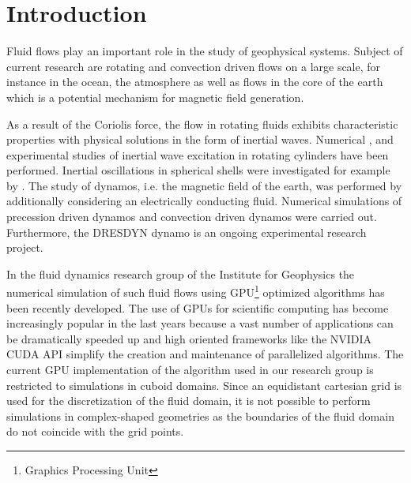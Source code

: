\chapter*{Introduction}

Fluid flows play an important role in the study of geophysical systems.
Subject of current research are rotating and convection driven flows on a large scale, for instance in the ocean, the atmosphere as
well as flows in the core of the earth which is a potential mechanism for magnetic field generation.

As a result of the Coriolis force, the flow in rotating fluids exhibits characteristic properties with
physical solutions in the form of inertial waves.
Numerical \citep{Sauret2012}, \citep{Duguet} and experimental
studies \citep{Fultz1959} of inertial wave excitation in rotating cylinders have been performed.
Inertial oscillations in spherical shells were investigated for example by \citep{Tilgner1999}.
The study of dynamos, i.e. the magnetic field of the earth, was performed by additionally
considering an electrically conducting fluid.
Numerical simulations of precession driven dynamos \citep{Tilgner2005}
and convection driven dynamos \citep{Tilgner2012} were carried out. Furthermore,
the DRESDYN dynamo \citep{Stefani2015} is an ongoing experimental research project.

In the fluid dynamics research group of the Institute for Geophysics
the numerical simulation of such fluid flows using GPU\footnote{Graphics Processing Unit} optimized algorithms has been recently developed.
The use of GPUs for scientific computing has become increasingly popular in the last years because
a vast number of applications  can  be dramatically speeded up and
high oriented frameworks like the NVIDIA CUDA API simplify the creation
and maintenance of parallelized algorithms.
The current GPU implementation of the algorithm used in our research group is restricted
to simulations in cuboid domains.
Since an equidistant cartesian grid is used for the discretization of the fluid
domain, it is not possible to perform simulations in complex-shaped geometries
as the boundaries of the fluid domain  do not coincide with the grid points.

